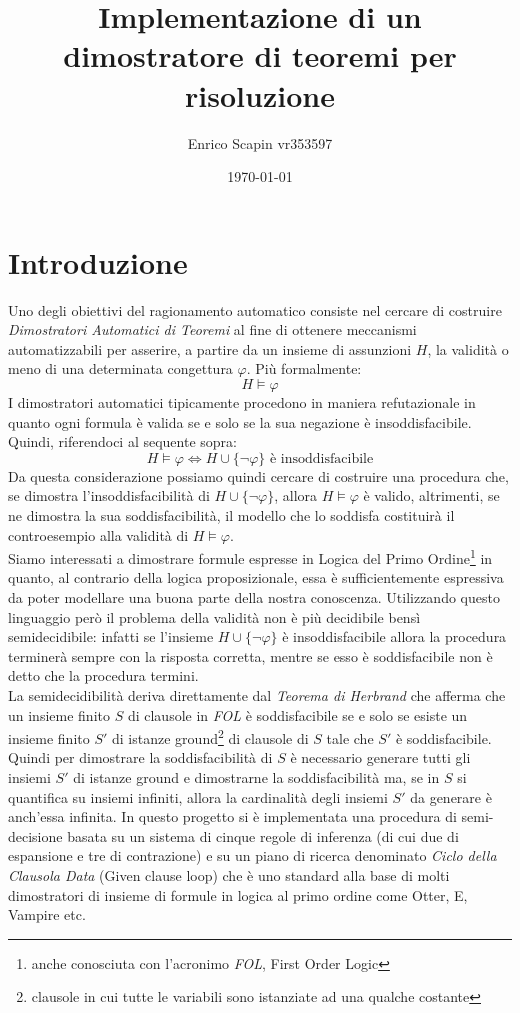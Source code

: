 \documentclass[a4paper,11pt]{article}
\title{\bf{Implementazione di un dimostratore di teoremi per risoluzione}}
\author{Enrico Scapin vr353597}
\date{\today}
\begin{document}
\maketitle

\small
\section{Introduzione}
Uno degli obiettivi del ragionamento automatico consiste nel cercare di costruire \emph{Dimostratori Automatici di Teoremi} al fine di ottenere meccanismi automatizzabili per asserire, a partire da un insieme di assunzioni $H$, la validità o meno di una determinata congettura $\varphi$. Più formalmente:
\[ H \models \varphi \]
I dimostratori automatici tipicamente procedono in maniera refutazionale in quanto ogni formula è valida se e solo se la sua negazione è insoddisfacibile. Quindi, riferendoci al sequente sopra:
\[ H \models \varphi \Longleftrightarrow H \cup \lbrace\neg \varphi\rbrace \text{ è insoddisfacibile} \]
Da questa considerazione possiamo quindi cercare di costruire una procedura che, se dimostra l'insoddisfacibilità di $H \cup \lbrace\neg \varphi\rbrace$, allora $ H \models \varphi $ è valido, altrimenti, se ne dimostra la sua soddisfacibilità, il modello che lo soddisfa costituirà il controesempio alla validità di $ H \models \varphi $.\\
Siamo interessati a dimostrare formule espresse in Logica del Primo Ordine\footnote{anche conosciuta con l'acronimo \emph{FOL}, First Order Logic} in quanto, al contrario della logica proposizionale, essa è sufficientemente espressiva da poter modellare una buona parte della nostra conoscenza. Utilizzando questo linguaggio però il problema della validità non è più decidibile bensì semidecidibile: infatti se l'insieme $H \cup \lbrace\neg \varphi\rbrace $ è insoddisfacibile allora la procedura terminerà sempre con la risposta corretta, mentre se esso è soddisfacibile non è detto che la procedura termini. \\
La semidecidibilità deriva direttamente dal \emph{Teorema di Herbrand} che afferma che un insieme finito $S$ di clausole in \emph{FOL} è soddisfacibile se e solo se esiste un insieme finito $S'$ di istanze ground\footnote{clausole in cui tutte le variabili sono istanziate ad una qualche costante} di clausole di $S$ tale che $S'$ è soddisfacibile. Quindi per dimostrare la soddisfacibilità di $S$ è necessario generare tutti gli insiemi $S'$ di istanze ground e dimostrarne la soddisfacibilità ma, se in $S$ si quantifica su insiemi infiniti, allora la cardinalità degli insiemi $S'$ da generare è anch'essa infinita.
In questo progetto si è implementata una procedura di semi-decisione basata su un sistema di cinque regole di inferenza (di cui due di espansione e tre di contrazione) e su un piano di ricerca denominato \emph{Ciclo della Clausola Data} (Given clause loop) che è uno standard alla base di molti dimostratori di insieme di formule in logica al primo ordine come Otter, E, Vampire etc.
\end{document}
